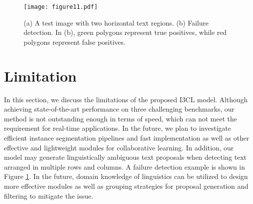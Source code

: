 \begin{table}[ht]\scriptsize
  \caption{Comparision results of speed between I3CL and some previous methods on CTW-1500 dataset.}
  \label{tab10}
  \begin{center}
\end{center}
\end{table}

\begin{figure}[ht]
  \centering
  \texttt{[image: figure11.pdf]}
  \caption{(a) A test image with two horizontal text regions. (b) Failure detection. In (b), green polygons represent true positives, while red polygons represent false positives.}
  \label{fig11}
\end{figure}



\section{Limitation}
In this section, we discuss the limitations of the proposed I3CL model. Although achieving state-of-the-art performance on three challenging benchmarks, our method is not outstanding enough in terms of speed, which can not meet the requirement for real-time applications. In the future, we plan to investigate efficient instance segmentation pipelines and fast implementation as well as other effective and lightweight modules for collaborative learning. In addition, our model may generate linguistically ambiguous text proposals when detecting text arranged in multiple rows and columns. A failure detection example is shown in Figure \ref{fig11}. In the future, domain knowledge of linguistics can be utilized to design more effective modules as well as grouping strategies for proposal generation and filtering to mitigate the issue.



